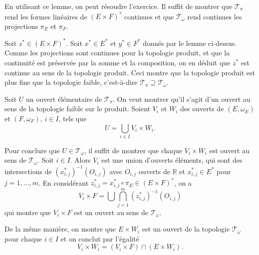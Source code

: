 En utilisant ce lemme, on peut résoudre l'exercice. Il suffit de montrer
que $\mathcal{T}_\pi$ rend les formes linéaires de $(E\times F)^*$
continues et que $\mathcal{T}_\omega$ rend continues les projections
$\pi_E$ et $\pi_F$.

Soit $z^*\in(E\times F)^*$. Soit $x^*\in E^*$ et $y^*\in F^*$ donnés par
le lemme ci-dessus. Comme les projections sont continues pour la topologie
produit, et que la continuité est préservée par la somme et la composition,
on en déduit que $z^*$ est continue au sens de la topologie produit. Ceci
montre que la topologie produit est plus fine que la topologie faible,
c'est-à-dire $\mathcal{T}_\pi\supseteq \mathcal{T}_\omega$.

Soit $U$ un ouvert élémentaire de $\mathcal{T}_\pi$.
On veut montrer qu'il s'agit d'un ouvert au sens de la topologie faible
sur le produit. Soient $V_i$ et $W_i$ des ouverts de $(E, \omega_E)$ et
$(F, \omega_F)$, $i\in I$, tels que
$$U=\bigcup_{i\in I} V_i\times W_i.$$

Pour conclure que $U\in\mathcal{T}_\omega$, il suffit de montrer que chaque
$V_i\times W_i$ est ouvert au sens de $\mathcal{T}_\omega$. Soit $i\in I$.
Alors $V_i$ est une union d'ouverts éléments, qui sont
des intersections de $(x_{i, j}^*)^{-1}(O_{i, j})$
avec $O_{i, j}$ ouverts de $\mathbb R$ et $x_{i, j}^*\in E^*$ pour $j = 1, \ldots, m$.
En considérant $z_{i, j}^*=x^*_{i, j}\circ\pi_E\in (E\times F)^*$, on a
$$V_i\times F = \bigcup\bigcap_{j=1}^m (z_{i, j}^*)^{-1}(O_{i, j})$$
qui montre que $V_i\times F$ est un ouvert au sens de $\mathcal{T}_\omega$.

De la même manière, on montre que $E\times W_i$ est un ouvert de
la topologie $\mathcal{T}_\omega$ pour chaque $i\in I$ et on conclut
par l'égalité
$$V_i\times W_i = (V_i\times F)\cap(E\times W_i).$$
